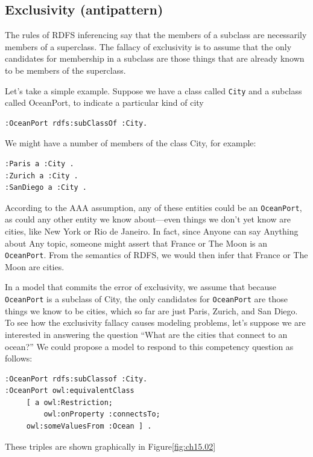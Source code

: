 \subsection{Exclusivity (antipattern)}

The rules of RDFS inferencing say that the members of a subclass are
necessarily members of a superclass. The fallacy of exclusivity is to
assume that the only candidates for membership in a subclass are those
things that are already known to be members of the superclass.

Let's take a simple example. Suppose we have a class called \texttt{City} and a
subclass called
OceanPort, to indicate a particular kind of city

\begin{lstlisting}
:OceanPort rdfs:subClassOf :City.
\end{lstlisting}

We might have a number of members of the class City, for example:

\begin{lstlisting}
:Paris a :City .
:Zurich a :City .
:SanDiego a :City .
\end{lstlisting}

According to the AAA assumption, any of these entities could be an
\texttt{OceanPort}, as could any other entity we know about---even things we
don't yet know are cities, like New York or Rio de Janeiro. In fact,
since Anyone can say Anything about Any topic, someone might assert that
France or The Moon is an \texttt{OceanPort}. From the semantics of RDFS, we would
then infer that France or The Moon are cities.

In a model that commits the error of exclusivity, we assume that because
\texttt{OceanPort} is a subclass of City, the only candidates for \texttt{OceanPort} are
those things we know to be cities, which so far are just Paris, Zurich,
and San Diego. To see how the exclusivity fallacy causes modeling
problems, let's suppose we are interested in answering the question
``What are the cities that connect to an ocean?'' We could propose a
model to respond to this competency question as follows:

\begin{lstlisting}
:OceanPort rdfs:subClassof :City.
:OceanPort owl:equivalentClass
     [ a owl:Restriction;
         owl:onProperty :connectsTo;
	 owl:someValuesFrom :Ocean ] .
\end{lstlisting}

These triples are shown graphically in Figure\ref{fig:ch15.02}


